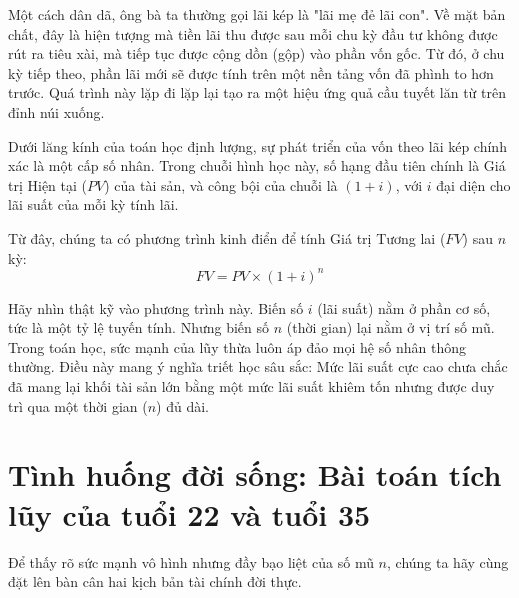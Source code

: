 \documentclass[14pt, a4paper, oneside]{extreport}
\begin{document}
Một cách dân dã, ông bà ta thường gọi lãi kép là "lãi mẹ đẻ lãi con". Về mặt bản chất, đây là hiện tượng mà tiền lãi thu được sau mỗi chu kỳ đầu tư không được rút ra tiêu xài, mà tiếp tục được cộng dồn (gộp) vào phần vốn gốc. Từ đó, ở chu kỳ tiếp theo, phần lãi mới sẽ được tính trên một nền tảng vốn đã phình to hơn trước. Quá trình này lặp đi lặp lại tạo ra một hiệu ứng quả cầu tuyết lăn từ trên đỉnh núi xuống.

Dưới lăng kính của toán học định lượng, sự phát triển của vốn theo lãi kép chính xác là một cấp số nhân. Trong chuỗi hình học này, số hạng đầu tiên chính là Giá trị Hiện tại ($PV$) của tài sản, và công bội của chuỗi là $(1 + i)$, với $i$ đại diện cho lãi suất của mỗi kỳ tính lãi.

Từ đây, chúng ta có phương trình kinh điển để tính Giá trị Tương lai ($FV$) sau $n$ kỳ:
\begin{equation}
    FV = PV \times (1 + i)^n
\end{equation}

Hãy nhìn thật kỹ vào phương trình này. Biến số $i$ (lãi suất) nằm ở phần cơ số, tức là một tỷ lệ tuyến tính. Nhưng biến số $n$ (thời gian) lại nằm ở vị trí số mũ. Trong toán học, sức mạnh của lũy thừa luôn áp đảo mọi hệ số nhân thông thường. Điều này mang ý nghĩa triết học sâu sắc: Mức lãi suất cực cao chưa chắc đã mang lại khối tài sản lớn bằng một mức lãi suất khiêm tốn nhưng được duy trì qua một thời gian ($n$) đủ dài. 

\section{Tình huống đời sống: Bài toán tích lũy của tuổi 22 và tuổi 35}

Để thấy rõ sức mạnh vô hình nhưng đầy bạo liệt của số mũ $n$, chúng ta hãy cùng đặt lên bàn cân hai kịch bản tài chính đời thực.
\end{document}
